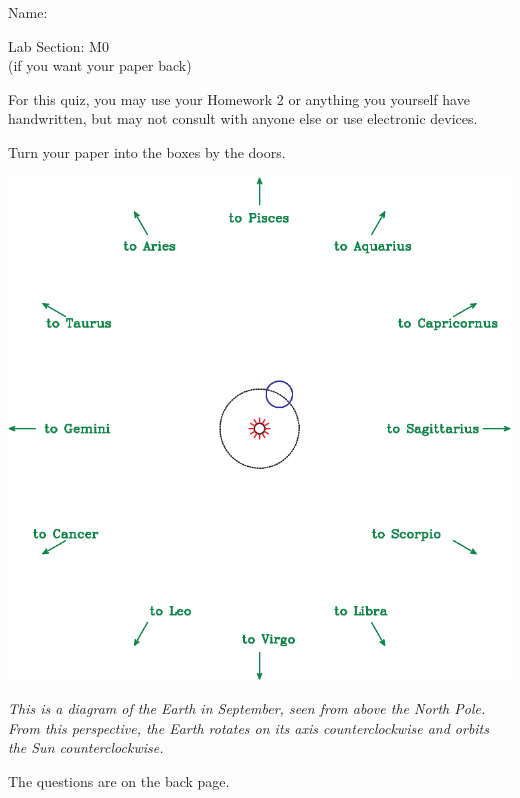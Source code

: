 \documentclass[12pt]{article}
\begin{document}
\Large
\centerline{}

\begin{minipage}{0.6\textwidth}
	\Large
	Name: \underline{\hspace{3in}}
\end{minipage}
\begin{minipage}{0.4\textwidth}
	\Large
	Lab Section: M0\underline{\hspace{1in}}\\
	\small (if you want your paper back)
\end{minipage}

\normalsize

For this quiz, you may use your Homework 2 or anything you yourself have handwritten, but may not consult with anyone else or use electronic devices.

Turn your paper into the boxes by the doors.



\begin{center}
\includegraphics[width=6in]{earth-orbit-quiz-crop.pdf}

\it This is a diagram of the Earth in September, seen from above the North Pole. From this perspective, the Earth rotates on its axis counterclockwise and orbits the Sun counterclockwise.

\bigskip

The questions are on the back page.

\end{center}
\newpage
\end{document}
